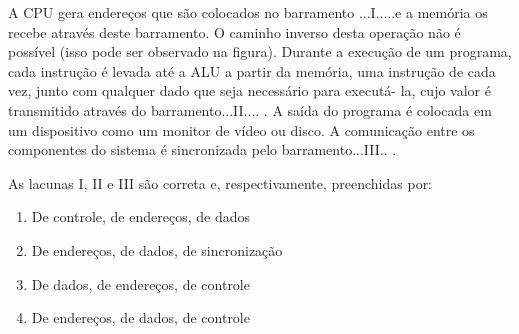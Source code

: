 \documentclass[aspectratio=169,
				xcolor=table]{beamer}
\begin{document}
	
	\begin{frame}
	\vspace{1em}
	A CPU gera endereços que são colocados no barramento ...I.....e a memória os recebe através deste barramento. O caminho inverso desta operação não é possível (isso pode ser observado na figura). Durante a execução de um programa, cada instrução é levada até a ALU a partir da memória, uma instrução de cada vez, junto com qualquer dado que seja necessário para executá- la, cujo valor é transmitido através do barramento...II.... . A saída do programa é colocada em um dispositivo como um monitor de vídeo ou disco. A comunicação entre os componentes do sistema é sincronizada pelo barramento...III.. .

	\vspace{.5em}
As lacunas I, II e III são correta e, respectivamente, preenchidas por:

	\begin{enumerate}[a]
		\normalsize
		\item De controle, de endereços,  de dados
		\item De endereços,  de dados, de sincronização
		\item De dados, de endereços, de controle
		\item De endereços,  de dados,  de controle
	\end{enumerate}


	\end{frame}
	
%
	
\end{document}
